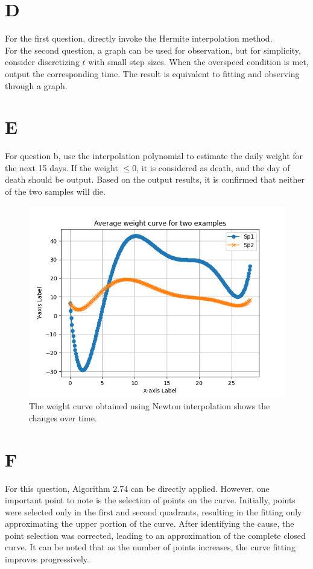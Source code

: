 \documentclass[a4paper]{article}
\begin{document}
\section*{D}

For the first question, directly invoke the Hermite interpolation method. \\
For the second question, a graph can be used for observation, but for simplicity, consider discretizing \( t \) with small step sizes. 
When the overspeed condition is met, output the corresponding time. The result is equivalent to fitting and observing through a graph.

\section*{E}

For question b, use the interpolation polynomial to estimate the daily weight for the next 15 days. 
If the weight \( \leq 0 \), it is considered as death, and the day of death should be output. 
Based on the output results, it is confirmed that neither of the two samples will die.
\begin{figure}[!h]
    \centering
    \includegraphics[width=0.5\linewidth]{Report_figure/figure_E.png}
    \caption{The weight curve obtained using Newton interpolation shows the changes over time.}
\end{figure}

\section*{F}

For this question, Algorithm 2.74 can be directly applied. However, one important point to note is the selection of points on the curve. 
Initially, points were selected only in the first and second quadrants, resulting in the fitting only approximating the upper portion of the curve. 
After identifying the cause, the point selection was corrected, leading to an approximation of the complete closed curve.
It can be noted that as the number of points increases, the curve fitting improves progressively.
    
\end{document}
